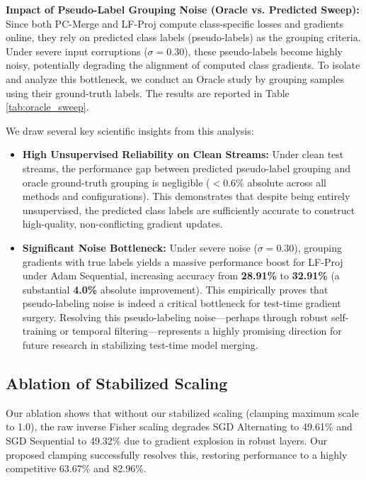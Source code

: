 \documentclass{article}
\theoremstyle{plain}
\theoremstyle{definition}
\theoremstyle{remark}
\begin{document}
\textbf{Impact of Pseudo-Label Grouping Noise (Oracle vs. Predicted Sweep):} Since both PC-Merge and LF-Proj compute class-specific losses and gradients online, they rely on predicted class labels (pseudo-labels) as the grouping criteria. Under severe input corruptions ($\sigma=0.30$), these pseudo-labels become highly noisy, potentially degrading the alignment of computed class gradients. To isolate and analyze this bottleneck, we conduct an Oracle study by grouping samples using their ground-truth labels. The results are reported in Table \ref{tab:oracle_sweep}.

We draw several key scientific insights from this analysis:
\begin{itemize}
    \item \textbf{High Unsupervised Reliability on Clean Streams:} Under clean test streams, the performance gap between predicted pseudo-label grouping and oracle ground-truth grouping is negligible ($<0.6\%$ absolute across all methods and configurations). This demonstrates that despite being entirely unsupervised, the predicted class labels are sufficiently accurate to construct high-quality, non-conflicting gradient updates.
    \item \textbf{Significant Noise Bottleneck:} Under severe noise ($\sigma=0.30$), grouping gradients with true labels yields a massive performance boost for LF-Proj under Adam Sequential, increasing accuracy from \textbf{28.91\%} to \textbf{32.91\%} (a substantial \textbf{4.0\%} absolute improvement). This empirically proves that pseudo-labeling noise is indeed a critical bottleneck for test-time gradient surgery. Resolving this pseudo-labeling noise—perhaps through robust self-training or temporal filtering—represents a highly promising direction for future research in stabilizing test-time model merging.
\end{itemize}

\subsection{Ablation of Stabilized Scaling}
Our ablation shows that without our stabilized scaling (clamping maximum scale to 1.0), the raw inverse Fisher scaling degrades SGD Alternating to 49.61\% and SGD Sequential to 49.32\% due to gradient explosion in robust layers. Our proposed clamping successfully resolves this, restoring performance to a highly competitive 63.67\% and 82.96\%.
\end{document}
